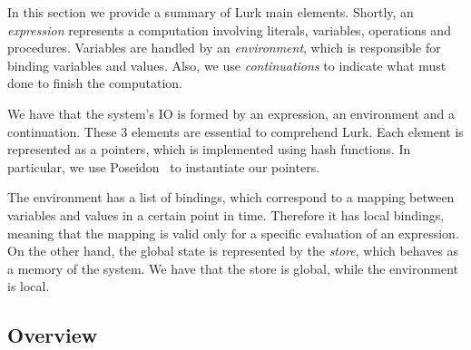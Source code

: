 \documentclass[10pt, english]{article}
\begin{document}
In this section we provide a summary of Lurk main elements. Shortly, an \textit{expression} represents a computation involving literals, variables, operations and procedures. Variables are handled by an \textit{environment}, which is responsible for binding variables and values. Also, we use \textit{continuations} to indicate what must done to finish the computation.

We have that the system's IO is formed by an expression, an environment and a continuation. These 3 elements are essential to comprehend Lurk. Each element is represented as a pointers, which is implemented using hash functions. In particular, we use Poseidon~\cite{poseidon} to instantiate our pointers.

The environment has a list of bindings, which correspond to a mapping between variables and values in a certain point in time. Therefore it has local bindings, meaning that the mapping is valid only for a specific evaluation of an expression. On the other hand, the global state is represented by the \textit{store}, which behaves as a memory of the system. We have that the store is global, while the environment is local.

\subsection{Overview}
\end{document}
